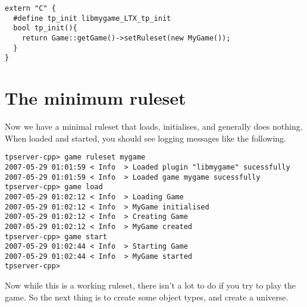 \documentclass[a4paper,11pt]{report}
\begin{document}
\begin{verbatim}
extern "C" {
  #define tp_init libmygame_LTX_tp_init
  bool tp_init(){
    return Game::getGame()->setRuleset(new MyGame());
  }
}
\end{verbatim}

\section{The minimum ruleset}
Now we have a minimal ruleset that loads, initialises, and generally does nothing. When loaded and started, you should see logging messages like the following.

\begin{verbatim}
tpserver-cpp> game ruleset mygame
2007-05-29 01:01:59 < Info  > Loaded plugin "libmygame" sucessfully
2007-05-29 01:01:59 < Info  > Loaded game mygame sucessfully
tpserver-cpp> game load
2007-05-29 01:02:12 < Info  > Loading Game
2007-05-29 01:02:12 < Info  > MyGame initialised
2007-05-29 01:02:12 < Info  > Creating Game
2007-05-29 01:02:12 < Info  > MyGame created
tpserver-cpp> game start
2007-05-29 01:02:44 < Info  > Starting Game
2007-05-29 01:02:44 < Info  > MyGame started
tpserver-cpp>
\end{verbatim}

Now while this is a working ruleset, there isn't a lot to do if you try to play the game. So the next thing is to create some object types, and create a universe.
\end{document}
